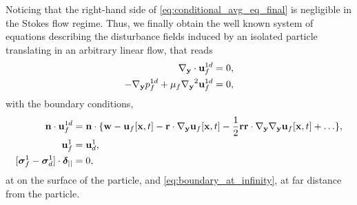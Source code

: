 Noticing that the right-hand side of \ref{eq:conditional_avg_eq_final} is negligible in the Stokes flow regime. 
Thus, we finally obtain the well known system of equations describing the disturbance fields induced by an isolated particle translating in an arbitrary linear flow, that reads 
\begin{align}
    {\mathbf{\nabla}_\textbf{y}} \cdot \textbf{u}^{1d}_f &= 0,  \\
    - {\mathbf{\nabla}_\textbf{y}} p_f^{1d} 
    + \mu_f {\mathbf{\nabla}_\textbf{y}}^2 \textbf{u}^{1d}_f  
    &= 0, 
    \label{eq:conditional_avg_eq_final_stokes}
\end{align}
with the boundary conditions, 
\begin{align*}
    \textbf{n}\cdot\textbf{u}^{1d}_f
    &= \textbf{n}\cdot\{
    \textbf{w} 
    - \textbf{u}_f[\textbf{x},t]
    -\textbf{r} \cdot {\mathbf{\nabla}_\textbf{y}}\textbf{u}_f[\textbf{x},t] 
    -\frac{1}{2}\textbf{rr} \cdot {\mathbf{\nabla}_\textbf{y}}{\mathbf{\nabla}_\textbf{y}}\textbf{u}_f[\textbf{x},t] + \ldots
    \},\\
    \textbf{u}^{1}_f
    &=\textbf{u}^{1}_d,\\
    [\bm\sigma^{1}_f - \bm\sigma^{1}_d ]\cdot\bm\delta_{||}
    &= 0, 
\end{align*}
at on the surface of the particle, and \ref{eq:boundary_at_infinity}, at far distance from the particle. 
